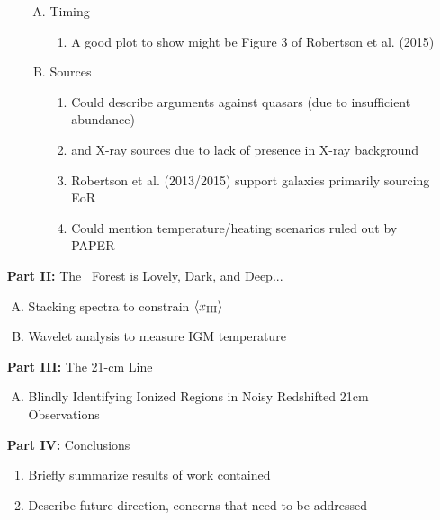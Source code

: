 \documentclass[11pt]{article}
\begin{document}
\begin{enumerate}
\begin{enumerate}[1.]
\begin{enumerate}[A.]
\item Timing
\begin{enumerate}[$\to$]
\item A good plot to show might be Figure 3 of Robertson et al. (2015)
\end{enumerate}
\item Sources
\begin{enumerate}[$\to$]
\item Could describe arguments against quasars (due to insufficient abundance) 
\item and X-ray sources due to lack of presence in X-ray background
\item Robertson et al. (2013/2015) support galaxies primarily sourcing EoR
\item Could mention temperature/heating scenarios ruled out by PAPER
\end{enumerate}
\end{enumerate}
\end{enumerate}




\item [{\bf Part II:}] The \lya\ Forest is Lovely, Dark, and Deep...
\begin{enumerate}[A.]
\item Stacking spectra to constrain $\langle x_{\text{HI}}\rangle$
\item Wavelet analysis to measure IGM temperature
\end{enumerate}
\item [{\bf Part III:}] The 21-cm Line
\begin{enumerate}[A.]
\item Blindly Identifying Ionized Regions in Noisy Redshifted 21cm Observations
\end{enumerate}
\item [{\bf Part IV:}] Conclusions
\begin{enumerate}[$\to$]
\item Briefly summarize results of work contained 
\item Describe future direction, concerns that need to be addressed
\end{enumerate}
\end{enumerate}
\end{document}
